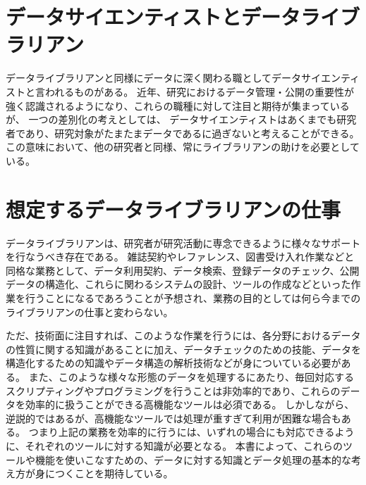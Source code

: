 \section{データサイエンティストとデータライブラリアン}
データライブラリアンと同様にデータに深く関わる職としてデータサイエンティストと言われるものがある。
近年、研究におけるデータ管理・公開の重要性が強く認識されるようになり、これらの職種に対して注目と期待が集まっているが、
一つの差別化の考えとしては、
データサイエンティストはあくまでも研究者であり、研究対象がたまたまデータであるに過ぎないと考えることができる。
この意味において、他の研究者と同様、常にライブラリアンの助けを必要としている。


\section{想定するデータライブラリアンの仕事}
データライブラリアンは、研究者が研究活動に専念できるように様々なサポートを行なうべき存在である。
雑誌契約やレファレンス、図書受け入れ作業などと同格な業務として、データ利用契約、データ検索、登録データのチェック、公開データの構造化、これらに関わるシステムの設計、ツールの作成などといった作業を行うことになるであろうことが予想され、業務の目的としては何ら今までのライブラリアンの仕事と変わらない。

ただ、技術面に注目すれば、このような作業を行うには、各分野におけるデータの性質に関する知識があることに加え、データチェックのための技能、データを構造化するための知識やデータ構造の解析技術などが身についている必要がある。
また、このような様々な形態のデータを処理するにあたり、毎回対応するスクリプティングやプログラミングを行うことは非効率的であり、これらのデータを効率的に扱うことができる高機能なツールは必須である。
しかしながら、逆説的ではあるが、高機能なツールでは処理が重すぎて利用が困難な場合もある。
つまり上記の業務を効率的に行うには、いずれの場合にも対応できるように、それぞれのツールに対する知識が必要となる。
本書によって、これらのツールや機能を使いこなすための、データに対する知識とデータ処理の基本的な考え方が身につくことを期待している。
